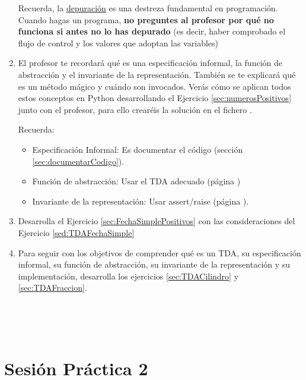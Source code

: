 \begin{enumerate}
Recuerda, la \underline{depuración} es una destreza fundamental en programación. Cuando hagas un programa, \textbf{no preguntes al profesor por qué no funciona si antes no lo has depurado} (es decir, haber comprobado el flujo de control y los valores que adoptan las variables)



\item 
El profesor te recordará qué es una especificación informal, la función de abstracción y el invariante de la representación. También se te explicará qué es un método mágico y cuándo son invocados. Verás cómo se aplican todos estos conceptos en Python desarrollando el Ejercicio \ref{sec:numerosPositivos} junto con el profesor, para ello crearéis la solución en el fichero . 

Recuerda:
\begin{itemize}
\item Especificación Informal: Es documentar el código (sección \ref{sec:documentarCodigo}).
\item Función de abstracción: Usar el TDA adecuado (página \pageref{sec:representacionTDA})
\item Invariante de la representación: Usar assert/raise (página \pageref{sec:representacionTDA}).
\end{itemize}


\item Desarrolla el Ejercicio \ref{sec:FechaSimplePositivos} con las consideraciones del Ejercicio \ref{sed:TDAFechaSimple}

\item Para seguir con los objetivos de comprender qué es un TDA, su especificación informal, su función de abstracción, su invariante de la representación y su implementación, desarrolla los ejercicios \ref{sec:TDACilindro} y \ref{sec:TDAFraccion}.
\end{enumerate}



\


\



\section*{Sesión Práctica 2 }


